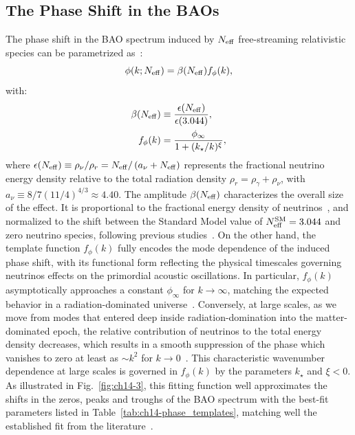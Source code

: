 \subsection{The Phase Shift in the BAOs}
\noindent The phase shift in the BAO spectrum induced by $N_{\rm eff}$ free-streaming relativistic species can be parametrized as~\cite{Baumann:2017gkg,Baumann:2019keh,Green:2020fjb}:
\begin{equation}
    \phi(k; N_{\rm eff})= \beta(N_{\rm eff})f_\phi(k), \label{eq:ch14-dphi}
\end{equation}
with:
\begin{align}
    \beta(N_{\rm eff})&\equiv \frac{\epsilon(N_{\rm eff})}{\epsilon(3.044)},\label{eq:ch14-beta} \\
    f_\phi(k)&=\frac{\phi_{\infty}}{1+(k_\star/k)^\xi},\label{eq:ch14-fphi}
\end{align}
 where $\epsilon(N_{\rm eff})\equiv \rho_\nu/\rho_r=N_{\rm eff}/\left(a_\nu +N_{\rm eff}\right)$ represents the fractional neutrino energy density relative to the total radiation density $\rho_r=\rho_\gamma+\rho_\nu$, with $a_\nu\equiv 8/7\left(11/4\right)^{4/3}\approx 4.40$. The amplitude $\beta(N_{\rm eff})$ characterizes the overall size of the effect. It is proportional to the fractional energy density of neutrinos~\cite{Bashinsky:2003tk, Baumann:2015rya}, and  normalized to the shift between the Standard Model value of $N_{\rm eff}^{\rm SM}=3.044$ and zero neutrino species, following previous studies~\cite{Baumann:2017gkg,Baumann:2019keh}.
 On the other hand, the template function $f_\phi(k)$ fully encodes the mode dependence of the induced phase shift, with its functional form reflecting the physical timescales governing neutrinos effects on the primordial acoustic oscillations. In particular, $f_\phi(k)$ asymptotically approaches a constant $\phi_\infty$ for $k\rightarrow\infty$, matching the expected behavior in a radiation-dominated universe~\cite{Bashinsky:2003tk,Baumann:2015rya}.  Conversely, at large scales, as we move  from modes that entered deep inside radiation-domination into the matter-dominated epoch, the relative contribution of neutrinos to the total energy density decreases, which results in a smooth suppression of the phase which vanishes to zero at least as $\sim k^2$ for $k \to 0$~\cite{Baumann:2015rya}. This characteristic wavenumber dependence at large scales is governed in $f_\phi(k)$ by the parameters $k_\star$ and $\xi<0$. As
illustrated in Fig.~\ref{fig:ch14-3}, this fitting function well approximates the shifts in the zeros, peaks and troughs of the BAO spectrum with the best-fit parameters listed in Table~\ref{tab:ch14-phase_templates}, matching well the established fit from the literature~\cite{Baumann:2017gkg}.

